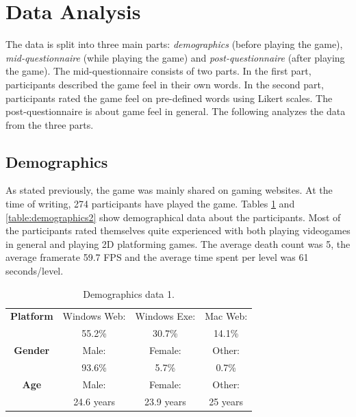 \section{Data Analysis} \label{data}
The data is split into three main parts: \textit{demographics} (before playing the game), \textit{mid-questionnaire} (while playing the game) and \textit{post-questionnaire} (after playing the game). The mid-questionnaire consists of two parts. In the first part, participants described the game feel in their own words. In the second part, participants rated the game feel on pre-defined words using Likert scales. The post-questionnaire is about game feel in general. The following analyzes the data from the three parts.

\subsection{Demographics}
As stated previously, the game was mainly shared on gaming websites. At the time of writing, 274 participants have played the game. Tables \ref{table:demographics1} and \ref{table:demographics2} show demographical data about the participants. Most of the participants rated themselves quite experienced with both playing videogames in general and playing 2D platforming games. The average death count was 5, the average framerate 59.7 FPS and the average time spent per level was 61 seconds/level.

\begin{table} \centering
\small
\caption{Demographics data 1.}
\label{table:demographics1}
\renewcommand{\arraystretch}{1.2}
\begin{tabular}{cccc}
\toprule
\textbf{Platform} & Windows Web: & Windows Exe: & Mac Web: \\
                  & 55.2\%      & 30.7\%      & 14.1\%  \\
\textbf{Gender}   & Male:        & Female:      & Other:   \\
                  & 93.6\%      & 5.7\%       & 0.7\%   \\
\textbf{Age}      & Male:     & Female:            & Other:        \\
                  & 24.6 years  & 23.9 years           & 25 years        \\
\bottomrule
\end{tabular}
\end{table}

